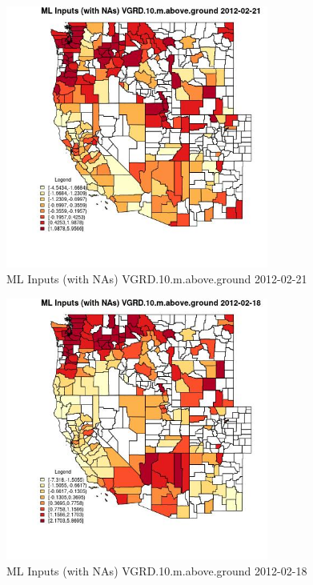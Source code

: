 \begin{figure} 
\centering  
\includegraphics[width=0.77\textwidth]{Code_Outputs/Report_ML_input_PM25_Step4_part_f_de_duplicated_aveswNAs_CountyVGRD10mabovegroundMean2012-02-21.jpg} 
\caption{\label{fig:Report_ML_input_PM25_Step4_part_f_de_duplicated_aveswNAsCountyVGRD10mabovegroundMean2012-02-21}ML Inputs (with NAs) VGRD.10.m.above.ground 2012-02-21} 
\end{figure} 
 

\begin{figure} 
\centering  
\includegraphics[width=0.77\textwidth]{Code_Outputs/Report_ML_input_PM25_Step4_part_f_de_duplicated_aveswNAs_CountyVGRD10mabovegroundMean2012-02-18.jpg} 
\caption{\label{fig:Report_ML_input_PM25_Step4_part_f_de_duplicated_aveswNAsCountyVGRD10mabovegroundMean2012-02-18}ML Inputs (with NAs) VGRD.10.m.above.ground 2012-02-18} 
\end{figure} 
 

